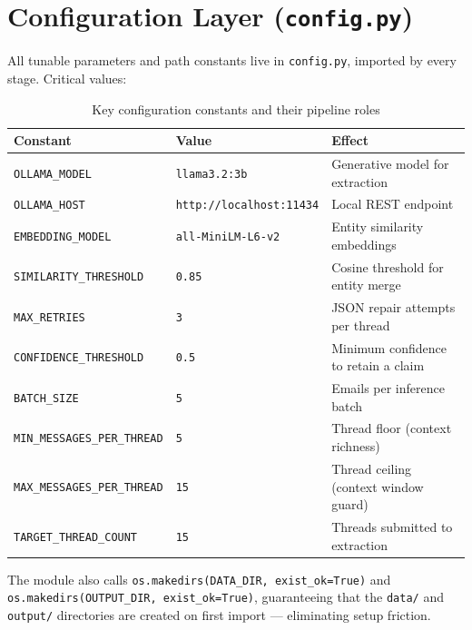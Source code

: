 \documentclass[12pt,a4paper]{article}
\begin{document}
\section{Configuration Layer (\texttt{config.py})}

All tunable parameters and path constants live in \texttt{config.py}, imported by every stage. Critical values:

\begin{table}[H]
\centering
\begin{tabular}{@{}lll@{}}
\toprule
\textbf{Constant} & \textbf{Value} & \textbf{Effect} \\ \midrule
\texttt{OLLAMA\_MODEL} & \texttt{llama3.2:3b} & Generative model for extraction \\
\texttt{OLLAMA\_HOST} & \texttt{http://localhost:11434} & Local REST endpoint \\
\texttt{EMBEDDING\_MODEL} & \texttt{all-MiniLM-L6-v2} & Entity similarity embeddings \\
\texttt{SIMILARITY\_THRESHOLD} & \texttt{0.85} & Cosine threshold for entity merge \\
\texttt{MAX\_RETRIES} & \texttt{3} & JSON repair attempts per thread \\
\texttt{CONFIDENCE\_THRESHOLD} & \texttt{0.5} & Minimum confidence to retain a claim \\
\texttt{BATCH\_SIZE} & \texttt{5} & Emails per inference batch \\
\texttt{MIN\_MESSAGES\_PER\_THREAD} & \texttt{5} & Thread floor (context richness) \\
\texttt{MAX\_MESSAGES\_PER\_THREAD} & \texttt{15} & Thread ceiling (context window guard) \\
\texttt{TARGET\_THREAD\_COUNT} & \texttt{15} & Threads submitted to extraction \\
\bottomrule
\end{tabular}
\caption{Key configuration constants and their pipeline roles}
\end{table}

The module also calls \texttt{os.makedirs(DATA\_DIR, exist\_ok=True)} and \texttt{os.makedirs(OUTPUT\_DIR, exist\_ok=True)}, guaranteeing that the \texttt{data/} and \texttt{output/} directories are created on first import — eliminating setup friction.

\end{document}
